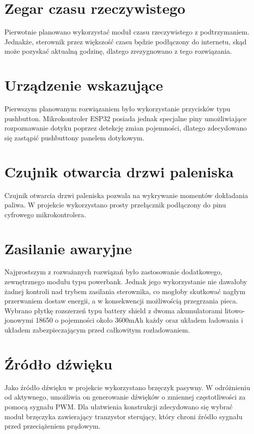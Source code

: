 \documentclass[11pt]{report}
\begin{document}
 \section{Zegar czasu rzeczywistego}
 Pierwotnie planowano wykorzystać moduł czasu rzeczywistego z podtrzymaniem. Jednakże, sterownik przez większość czasu będzie podłączony do internetu, skąd może pozyskać aktualną godzinę, dlatego zrezygnowano z tego rozwiązania.
 
 \section{Urządzenie wskazujące}
 Pierwszym planowanym rozwiązaniem było wykorzystanie przycisków typu pushbutton. Mikrokontroler ESP32 posiada jednak specjalne piny umożliwiające rozpoznawanie dotyku poprzez detekcję zmian pojemności, dlatego zdecydowano się zastąpić pushbuttony panelem dotykowym.
 
 \section{Czujnik otwarcia drzwi paleniska}
 Czujnik otwarcia drzwi paleniska pozwala na wykrywanie momentów dokładania paliwa. W projekcie wykorzystano prosty przełącznik podłączony do pinu cyfrowego mikrokontrolera.
 
 \section{Zasilanie awaryjne}
 Najprostszym z rozważanych rozwiązań było zastosowanie dodatkowego, zewnętrznego modułu typu powerbank. Jednak jego wykorzystanie nie dawałoby żadnej kontroli nad trybem zasilania sterownika, co mogłoby skutkować nagłym przerwaniem dostaw energii, a w konsekwencji możliwością przegrzania pieca. Wybrano płytkę rozszerzeń typu battery shield z dwoma akumulatorami litowo-jonowymi 18650 o pojemności około 3600mAh każdy oraz układem ładowania i układem zabezpieczającym przed całkowitym rozładowaniem.
 
 \section{Źródło dźwięku}
 Jako źródło dźwięku w projekcie wykorzystano brzęczyk pasywny. W odróżnieniu od aktywnego, umożliwia on generowanie dźwięków o zmiennej częstotliwości za pomocą sygnału PWM. Dla ułatwienia konstrukcji zdecydowano się wybrać moduł brzęczyka zawierający tranzystor sterujący, który chroni źródło sygnału przed przeciążeniem prądowym.
 
\end{document}
